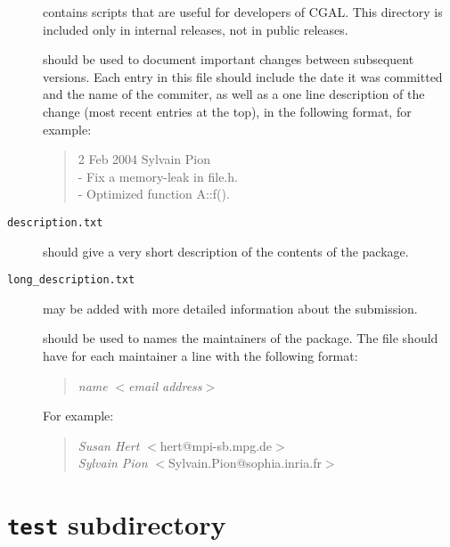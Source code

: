 \begin{description}
       contains scripts that are useful for
       developers of CGAL. This directory is included only in internal
       releases, not in public releases.
  \item[\ccAnchor{example/changes.txt}{{\tt changes.txt}}]%
       should be used to document important changes between 
       subsequent versions. Each entry in this file should include
       the date it was committed and the name of the commiter, as well as
       a one line description of the change (most recent entries at the top),
       in the following format, for example:
       \begin{verse}
       2 Feb 2004  Sylvain Pion\\
       - Fix a memory-leak in file.h.\\
       - Optimized function A::f().
       \end{verse}

  \item[{\tt description.txt}]%
       should give a very short description of the contents of the package. 
  \item[{\tt long\_description.txt}]%
       may be added with more detailed information about the submission. 
  \item[\ccAnchor{example/maintainer}{{\tt maintainer}}]%
       should be used to names the maintainers of the package. The file should
       have for each maintainer a line with the following format:
       \begin{verse}
       {\it name} $<${\it email address}$>$\\
       \end{verse}
       For example:
       \begin{verse}
       {\it Susan Hert} $<$hert@mpi-sb.mpg.de$>$\\
       {\it Sylvain Pion} $<$Sylvain.Pion@sophia.inria.fr$>$\\
       \end{verse}
\end{description}

\section{{\tt test} subdirectory}
\label{sec:test_subdirectory}

